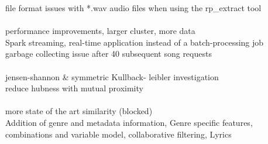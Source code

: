 file format issues with *.wav audio files when using the rp\_extract tool\\
\ \\
performance improvements, larger cluster, more data\\
Spark streaming, real-time application instead of a batch-processing job\\
garbage collecting issue after 40 subsequent song requests\\
\ \\
jensen-shannon \& symmetric Kullback- leibler investigation\\
reduce hubness with mutual proximity\\
\ \\
more state of the art similarity (blocked)\\
Addition of genre and metadata information, Genre specific features, combinations and variable model, collaborative filtering, Lyrics\\

